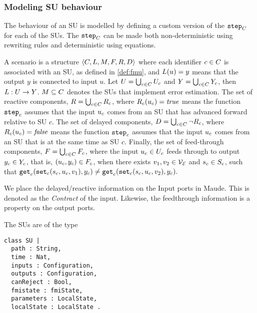 \subsubsection{Modeling SU behaviour}
The behaviour of an SU is modelled by defining a custom version of the $\mathtt{step}_{C}$ for each of the SUs. 
The $\mathtt{step}_{C}$ can be made both non-deterministic using rewriting rules and deterministic using equations.



\begin{definition}[Scenario]\label{def:cosim_scenario}
  A scenario is a structure $ \left\langle C, L, M, F, R, D \right\rangle $ where each identifier $c \in C$ is associated with an SU, as defined in \cref{def:fmu}, and $L(u)=y$ means that the output $y$ is connected to input $u$.
  Let $U = \bigcup_{c \in C} U_{c}$ and $Y = \bigcup_{c \in C} Y_{c}$, then $L : U \to Y$. 
  $M \subseteq C$ denotes the SUs that implement error estimation. 
  The set of reactive components,
  $R = \bigcup_{c \in C} R_{c}$, where $R_{c}(u_{c}) = \mathit{true}$ means the function $\mathtt{step}_{c}$ assumes that the input $u_{c}$ comes from an SU that has advanced forward relative to SU $c$.  
The set of delayed components,
  $D = \bigcup_{c \in C} \neg R_{c}$, where $R_{c}(u_{c}) = \mathit{false}$ means the function $\mathtt{step}_{c}$ assumes that the input $u_{c}$ comes from an SU that is at the same time as SU $c$. 
 Finally, the set of feed-through components, $F = \bigcup_{c \in C} F_{c}$, where the input $u_{c} \in U_{c}$ feeds through to output $y_{c} \in Y_{c}$, that is, $(u_{c},y_{c}) \in F_{c}$, when there exists $v_1, v_2 \in \mathcal{V_{E}}$ and $s_{c} \in S_{c}$, such that
  $\mathtt{get}_{c} (\mathtt{set}_{c}(s_{c}, u_{c}, v_1), y_{c}) \neq \mathtt{get}_{c} (\mathtt{set}_{c}(s_{c}, u_{c}, v_2), y_{c}).$
\end{definition}

We place the delayed/reactive information on the Input ports in Maude. This is denoted as the \textit{Contract} of the input.
Likewise, the feedthrough information is a property on the output ports.  

The SUs are of the type 
\begin{lstlisting}
class SU |
  path : String, 
  time : Nat, 
  inputs : Configuration, 
  outputs : Configuration,
  canReject : Bool, 
  fmistate : fmiState,
  parameters : LocalState,
  localState : LocalState .
\end{lstlisting}




